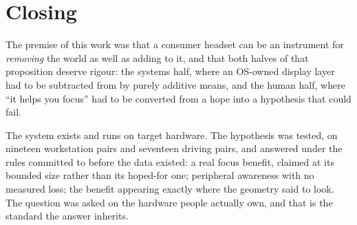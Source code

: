 \section{Closing}

The premise of this work was that a consumer headset can be an instrument for \textit{removing} the
world as well as adding to it, and that both halves of that proposition deserve rigour: the systems
half, where an OS-owned display layer had to be subtracted from by purely additive means, and the
human half, where ``it helps you focus'' had to be converted from a hope into a hypothesis that could
fail.

The system exists and runs on target hardware. The hypothesis was tested, on nineteen workstation
pairs and seventeen driving pairs, and answered under the rules committed to before the data existed:
a real focus benefit, claimed at its bounded size rather than its hoped-for one; peripheral
awareness with no measured loss; the benefit appearing exactly where the geometry said to look. The question was
asked on the hardware people actually own, and that is the standard the answer inherits.
